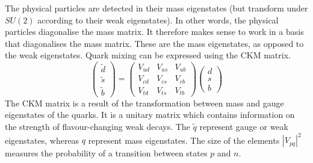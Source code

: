 The physical particles are detected in their mass eigenstates (but transform under $SU(2)$ according to their weak eigenstates). In other words, the physical particles diagonalise the mass matrix. It therefore makes sense to work in a basis that diagonalises the mass matrix. These are the mass eigenstates, as opposed to the weak eigenstates. Quark mixing can be expressed using the CKM matrix.
%
\begin{equation}
    \begin{pmatrix}
        \tilde{d} \\ \tilde{s} \\ \tilde{b} 
    \end{pmatrix}
    = \begin{pmatrix}
        V_{ud} & V_{us} & V_{ub} \\  
        V_{cd} & V_{cs} & V_{cb} \\  
        V_{td} & V_{ts} & V_{tb} 
    \end{pmatrix}
    \begin{pmatrix}
        {d} \\ {s} \\ {b} 
    \end{pmatrix}
\end{equation}
%
The CKM matrix is a result of the transformation between mass and gauge eigenstates of the quarks. It is a unitary matrix which contains information on the strength of flavour-changing weak decays. The $\tilde{q}$ represent gauge or weak eigenstates, whereas $q$ represent mass eigenstates. The size of the elements $|V_{pq}|^2$ measures the probability of a transition between states $p$ and $n$.

